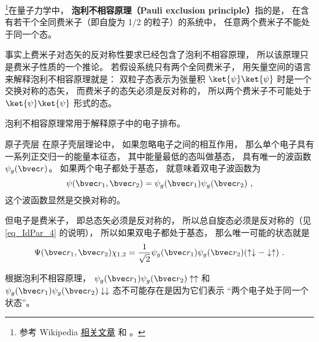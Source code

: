 
\begin{issues}
\issueDraft
\end{issues}

\footnote{参考 Wikipedia \href{https://en.wikipedia.org/wiki/Pauli_exclusion_principle}{相关文章} 和 \cite{GriffQ}。}在量子力学中， \textbf{泡利不相容原理（Pauli exclusion principle）}指的是， 在含有若干个全同费米子（即自旋为 1/2 的粒子）的系统中， 任意两个费米子不能处于同一个态。

事实上费米子对态矢的反对称性要求已经包含了泡利不相容原理， 所以该原理只是费米子性质的一个推论。 若假设系统只有两个全同费米子， 用矢量空间的语言来解释泡利不相容原理就是： 双粒子态表示为张量积 $\ket{\psi}\ket{\psi}$ 时是一个交换对称的态矢， 而费米子的态矢必须是反对称的， 所以两个费米子不可能处于 $\ket{\psi}\ket{\psi}$ 形式的态。

泡利不相容原理常用于解释原子中的电子排布。

\begin{example}{原子壳层}
在原子壳层理论中， 如果忽略电子之间的相互作用， 那么单个电子具有一系列正交归一的能量本征态， 其中能量最低的态叫做基态， 具有唯一的波函数 $\psi_g(\bvec r)$。 如果两个电子都处于基态， 就意味着双电子波函数为
\begin{equation}
\psi(\bvec r_1, \bvec r_2) = \psi_g(\bvec r_1)\psi_g(\bvec r_2)~,
\end{equation}
这个波函数显然是交换对称的。

但电子是费米子， 即总态矢必须是反对称的， 所以总自旋态必须是反对称的（见\autoref{eq_IdPar_4} 的说明）， 所以如果双电子都处于基态， 那么唯一可能的状态就是
\begin{equation}
\Psi(\bvec r_1, \bvec r_2) \chi_{1,2} = \frac{1}{\sqrt{2}}\psi_g(\bvec r_1)\psi_g(\bvec r_2)(\uparrow\downarrow - \downarrow\uparrow)~.
\end{equation}

根据泡利不相容原理， $\psi_g(\bvec r_1)\psi_g(\bvec r_2)\uparrow\uparrow$ 和 $\psi_g(\bvec r_1)\psi_g(\bvec r_2)\downarrow\downarrow$ 态不可能存在是因为它们表示 “两个电子处于同一个状态”。
\end{example}
